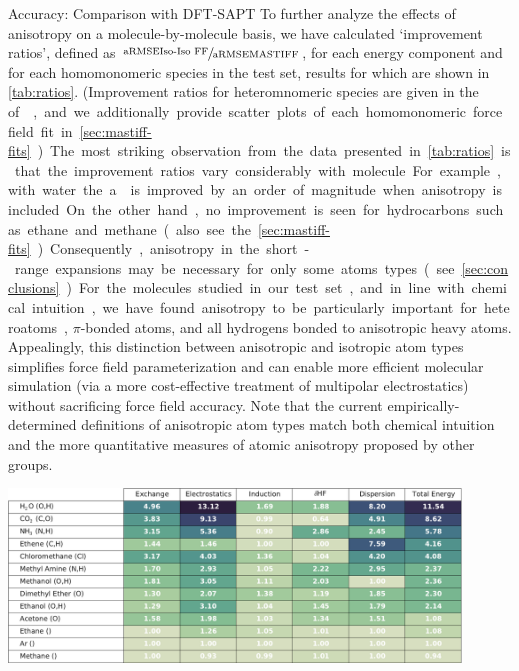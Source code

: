 \begin{subsection}{Accuracy: Comparison with DFT-SAPT}
To further analyze the effects of anisotropy on a molecule-by-molecule basis, we have calculated
`improvement ratios', defined as 
$\sfrac{\text{a\rmse \isoff}}{\text{a\rmse \mastiff}}$,
for each energy component and for
each homomonomeric species in the test set, results for which are shown in
\cref{tab:ratios}. 
(Improvement ratios for heteromnomeric species are given in the \si of
, and we additionally provide
scatter plots of each homomonomeric force field fit in \cref{sec:mastiff-fits}.)

The most striking observation from the data presented in \cref{tab:ratios} is that
the improvement ratios vary considerably with molecule. For example, with water
the a\rmse is improved by an order of magnitude when anisotropy is included. On
the other hand, no improvement is seen for hydrocarbons such as ethane and
methane (also see the \cref{sec:mastiff-fits}). Consequently, anisotropy in the short-range expansions
may be necessary for only some atoms types (see \cref{sec:conclusions}). For the molecules
studied in our test set, and in line with chemical intuition, we have found
anisotropy to be particularly important for 
heteroatoms, $\pi$-bonded atoms,
and all hydrogens bonded to anisotropic heavy atoms. 
Appealingly, this distinction between anisotropic and
isotropic atom types 
simplifies force field parameterization and can enable more efficient molecular
simulation (via a more cost-effective treatment of multipolar electrostatics) without sacrificing force field accuracy.
Note that the current empirically-determined
definitions of anisotropic atom types
match both chemical intuition and the more quantitative measures
of atomic anisotropy proposed by other groups.\cite{Kramer2014,Wheatley2012}


    \begin{table}[ht]
    \centering
    \includegraphics[width=0.9\textwidth]{anisotropic/figures/homodimer_error_ratios.pdf}
    \caption{
`Improvement Ratios' for each homomonomeric species in the
91 dimer test set. For each dimer and energy component, the improvement ratio
is calculated as the ratio of a\rmse between \isoff and \mastiff; values
greater than 1 indicate decreased errors in the anisotropic model. Entries have
been ordered according to the improvement ratio for the total energy.
            }
    \label{tab:ratios}
    \end{table}



\end{subsection}
